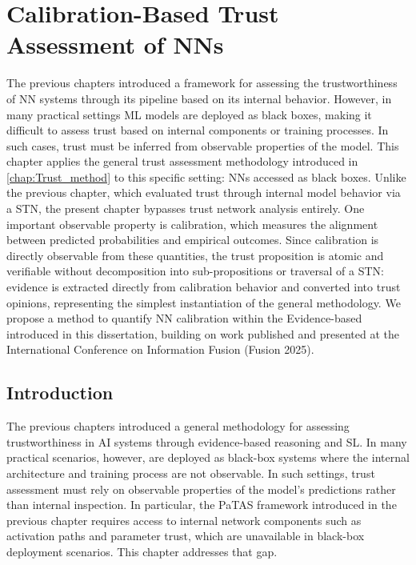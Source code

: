 \chapter{Calibration-Based Trust Assessment of \acp{NN}}
\label{chap:bb}
\noindent

The previous chapters introduced a framework for assessing the trustworthiness of \ac{NN} systems through its pipeline based on its internal behavior. However, in many practical settings \ac{ML} models are deployed as black boxes, making it difficult to assess trust based on internal components or training processes. In such cases, trust must be inferred from observable properties of the model. This chapter applies the general trust assessment methodology introduced in \cref{chap:Trust_method} to this specific setting: \acp{NN} accessed as black boxes. Unlike the previous chapter, which evaluated trust through internal model behavior via a \acf{STN}, the present chapter bypasses trust network analysis entirely. One important observable property is calibration, which measures the alignment between predicted probabilities and empirical outcomes. Since calibration is directly observable from these quantities, the trust proposition is atomic and verifiable without decomposition into sub-propositions or traversal of a \ac{STN}: evidence is extracted directly from calibration behavior and converted into trust opinions, representing the simplest instantiation of the general methodology. We propose a method to quantify \ac{NN} calibration within the Evidence-based  introduced in this dissertation, building on work published and presented at the International Conference on Information Fusion (Fusion 2025)\cite{11124121}.



\section{Introduction}

The previous chapters introduced a general methodology for assessing trustworthiness in AI systems through evidence-based reasoning and \acf{SL}. In many practical scenarios, however,  are deployed as black-box systems where the internal architecture and training process are not observable. In such settings, trust assessment must rely on observable properties of the model’s predictions rather than internal inspection. In particular, the \ac{PaTAS} framework introduced in the previous chapter requires access to internal network components such as activation paths and parameter trust, which are unavailable in black-box deployment scenarios. This chapter addresses that gap.

